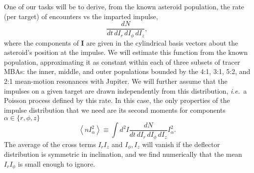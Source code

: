 \documentclass[linenumbers, onecolumn]{aastex631}
\newcommand{\ie}{\textit{i.e.\/}}
\newcommand{\vecI}{\mathbf{I}}
\begin{document}
One of our tasks will be to derive, from the known asteroid population, the rate (per target) of encounters vs the imparted impulse,
\begin{equation}
  \frac{dN}{dt\,dI_r\,dI_\phi\,dI_z},
  \label{eq:dN}
\end{equation}
where the components of $\vecI$ are given in the cylindrical basis
vectors about the asteroid's position at the impulse.
We will estimate this function from the known population,
approximating it as constant within each of three subsets of tracer MBAs:
the inner, middle, and outer populations bounded by the 4:1, 3:1,
5:2, and 2:1 mean-motion resonances with Jupiter.
We will further assume that the impulses on a given target are drawn
independently from this distribution, \ie\ a Poisson process defined
by this rate.  In this case, the only properties of the impulse
distribution that we need are its second moments for components $\alpha \in \{r,\phi,z\}$
\begin{equation}
  \left \langle n I_\alpha^2 \right\rangle \equiv \int d^2I \frac{dN}{dt\,dI_r\,dI_\phi\,dI_z} I_\alpha^2.
\label{eq:nvsq}
\end{equation}
The average of the cross terms $I_rI_z$ and $I_\phi, I_z$ will vanish if the deflector distribution is symmetric in inclination, and we find numerically that the mean $I_rI_\phi$ is small enough to ignore.
\end{document}
